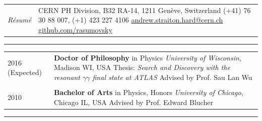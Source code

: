 \documentclass{letter}
\begin{document}
 


\begin{tabular}{p{}p{}}
	\hfill \newline \href{https://ch.linkedin.com/in/andrew-hard-25b690a5}{\Huge{\color{Maroon}{Andrew Hard}}} \newline \LARGE{\textit{R\'{e}sum\'{e}}} \newline
	&
	\hfill \newline CERN PH Division, B32 RA-14, 1211 Gen\`{e}ve, Switzerland \newline
	(+41) 76 30 88 007, (+1) 423 227 4106 \newline
	\href{mailto:ahard@cern.ch}{andrew.straiton.hard@cern.ch} \newline
	\href{https://github.com/rasumovsky}{github.com/rasumovsky}\\
\end{tabular}

\begin{flushleft}
\Large{\textsc{\textbf{\color{Maroon}{Education}}}}
\vspace{1pt} %
\hrule
\end{flushleft}

\begin{tabular}{p{}p{}}
	2016 (Expected)
	&
	\textbf{Doctor of Philosophy} in Physics \newline 
	\textit{University of Wisconsin}, Madison WI, USA \newline
	Thesis: \textit{Search and Discovery with the resonant $\gamma\gamma$ final state at ATLAS} \newline
	Advised by Prof. Sau Lan Wu \\
\\
	2010 
	& 
	\textbf{Bachelor of Arts} in Physics, Honors \newline 
	\textit{University of Chicago}, Chicago IL, USA \newline
	Advised by Prof. Edward Blucher 
\\
\end{tabular}

\begin{flushleft}
\Large{\textsc{\textbf{\color{Maroon}{Experience}}}}
\vspace{1pt} %
\hrule
\end{flushleft}
\end{document}
